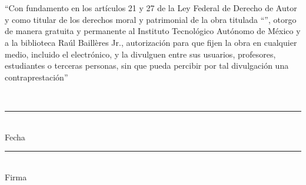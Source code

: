 \thispagestyle{empty}
\chapter*{\phantom{Declaración}}
``Con fundamento en los artículos 21 y 27 de la Ley Federal de Derecho de Autor y como titular de los derechos moral y patrimonial de la obra titulada ``\textbf{\thetitle}'', otorgo de manera gratuita y permanente al Instituto Tecnológico Autónomo de México y a la biblioteca Raúl Baillères Jr., autorización para que fijen la obra en cualquier medio, incluido el electrónico, y la divulguen entre sus usuarios, profesores, estudiantes o terceras personas, sin que pueda percibir por tal divulgación una contraprestación''
    \\
    \begin{center}
        \theauthor\\
        \vspace{4em}
        \rule[0mm]{60mm}{0.1mm}\\
        Fecha\\
        \vspace{3em}
        \rule[0mm]{60mm}{0.1mm}\\
        Firma\\
    \end{center}
\clearpage